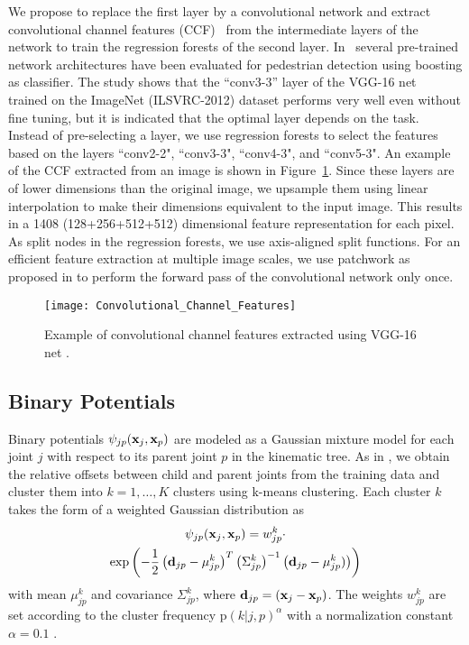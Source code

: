 \documentclass[a4paper, 10pt, conference]{ieeeconf}      \usepackage{FG2017}
\begin{document}
We propose to replace the first layer by a convolutional network and extract convolutional channel features (CCF)~\cite{yang_iccv2015} from the intermediate layers of the network to train the regression forests of the second layer. In~\cite{yang_iccv2015} several pre-trained network architectures have been evaluated for pedestrian detection using boosting as classifier. The study shows that the ``conv3-3'' layer of the VGG-16 net~\cite{Simonyan14c} trained on the ImageNet (ILSVRC-2012) dataset performs very well even without fine tuning, but it is indicated that the optimal layer depends on the task. Instead of pre-selecting a layer, we use regression forests to select the features based on the layers ``conv2-2", ``conv3-3", ``conv4-3", and ``conv5-3". An example of the CCF extracted from an image is shown in Figure~\ref{fig:ccf}. Since these layers are of lower dimensions than the original image, we upsample them using linear interpolation to make their dimensions equivalent to the input image. This results in a 1408 (128+256+512+512) dimensional feature representation for each pixel. As split nodes in the regression forests, we use axis-aligned split functions. For an efficient feature extraction at multiple image scales, we use patchwork as proposed in \cite{iandola2014densenet} to perform the forward pass of the convolutional network only once. 


\begin{figure}
\centering
\captionsetup[figure]{skip=0pt}
\texttt{[image: Convolutional\_Channel\_Features]}
\caption{Example of convolutional channel features extracted using VGG-16 net \cite{Simonyan14c}.}
\label{fig:ccf}
\end{figure}

\subsection{Binary Potentials}
\label{sec:binary_potentials}
Binary potentials $\psi_{jp}(\bold{x}_j, \bold{x}_p)$ are modeled as a Gaussian mixture model for each joint $j$ with respect to its parent joint $p$ in the kinematic tree. As in \cite{dantone_tpami2014}, we obtain the relative offsets between child and parent joints from the training data and cluster them into $k=1, \dots, K$ clusters using k-means clustering. Each cluster $k$ takes the form of a weighted Gaussian distribution as
\begin{multline}\label{eq:binary}
\psi_{jp}(\bold{x}_j, \bold{x}_p) = w_{jp}^{k} \cdot \\ \exp\left(-\dfrac{1}{2}\left(\bold{d}_{jp}-\mu_{jp}^{k}\right)^T\left(\Sigma_{jp}^{k}\right)^{-1}\left(\bold{d}_{jp}-\mu_{jp}^{k})\right)\right)
\end{multline}
with mean $\mu_{jp}^{k}$ and covariance $\Sigma_{jp}^{k}$, where $\bold{d}_{jp} = (\bold{x}_j-\bold{x}_p)$. The weights $w_{jp}^{k}$ are set according to the cluster frequency $\mathrm{p}(k|j,p)^\alpha$ with a normalization constant $\alpha=0.1$ \cite{dantone_tpami2014}. 
\end{document}
